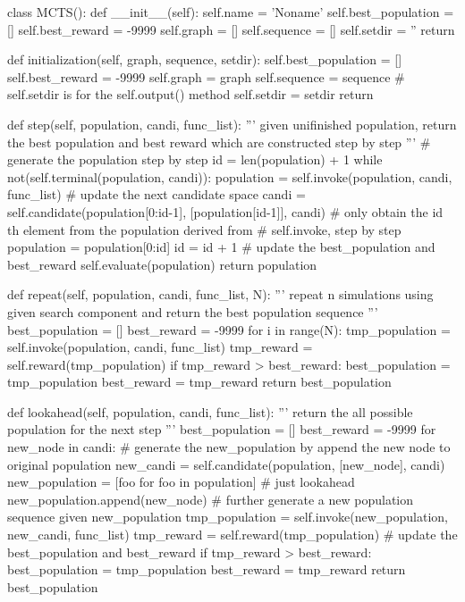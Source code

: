 \documentclass{article}
\begin{document}
\begin{python}[moreemph={[4]42},caption={A General Framework of MCTS based on Python},label=ex1]
class MCTS():
    def __init__(self):
        self.name = 'Noname'
        self.best_population = []
        self.best_reward = -9999
        self.graph = []
        self.sequence = []
        self.setdir = ''
        return
        
    def initialization(self, graph, sequence, setdir):
        self.best_population = []
        self.best_reward = -9999
        self.graph = graph
        self.sequence = sequence
        # self.setdir is for the self.output() method
        self.setdir = setdir
        return 
    
    def step(self, population, candi, func_list):
        ''' given unifinished population, return the best population and best reward
        which are constructed step by step '''
        # generate the population step by step
        id = len(population) + 1
        while not(self.terminal(population, candi)):
            population = self.invoke(population, candi, func_list)
            # update the next candidate space
            candi = self.candidate(population[0:id-1], [population[id-1]], candi)
            # only obtain the id th element from the population derived from
            # self.invoke, step by step
            population = population[0:id]
            id = id + 1
        # update the best_population and best_reward
        self.evaluate(population)
        return population
        
    def repeat(self, population, candi, func_list, N):
        ''' repeat n simulations using given search component and return the best
        population sequence '''
        best_population = []
        best_reward = -9999
        for i in range(N):
            tmp_population = self.invoke(population, candi, func_list)
            tmp_reward = self.reward(tmp_population)
            if tmp_reward > best_reward:
                best_population = tmp_population
                best_reward = tmp_reward
        return best_population
    
    def lookahead(self, population, candi, func_list):
        ''' return the all possible population for the next step '''
        best_population = []
        best_reward = -9999
        for new_node in candi:
            # generate the new_population by append the new node to original population
            new_candi = self.candidate(population, [new_node], candi)
            new_population = [foo for foo in population]            
            # just lookahead 
            new_population.append(new_node)
            # further generate a new population sequence given new_population
            tmp_population = self.invoke(new_population, new_candi, func_list)
            tmp_reward = self.reward(tmp_population)
            # update the best_population and best_reward
            if tmp_reward > best_reward:
                best_population = tmp_population
                best_reward = tmp_reward
        return best_population
        

\end{python}
\end{document}
